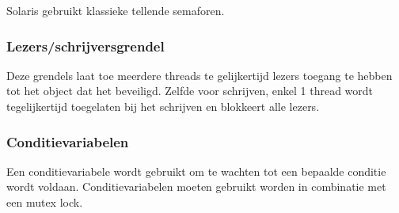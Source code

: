 Solaris gebruikt klassieke tellende semaforen.

\subsubsection{Lezers/schrijversgrendel}

Deze grendels laat toe meerdere threads te gelijkertijd lezers toegang te hebben tot het object dat het beveiligd. Zelfde voor schrijven, enkel 1 thread wordt tegelijkertijd toegelaten bij het schrijven en blokkeert alle lezers.

\subsubsection{Conditievariabelen}

Een conditievariabele wordt gebruikt om te wachten tot een bepaalde conditie wordt voldaan. Conditievariabelen moeten gebruikt worden in combinatie met een mutex lock.